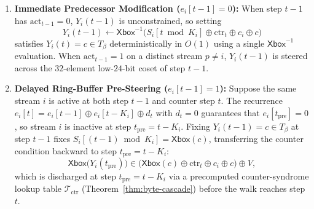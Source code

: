 \documentclass[11pt,a4paper]{article}
\theoremstyle{definition}
\theoremstyle{remark}
\newcommand{\Xbox}{\mathsf{Xbox}}
\begin{document}
\begin{itemize}[leftmargin=2em]
    \begin{enumerate}
        \item \textbf{Immediate Predecessor Modification ($e_i[t-1] = 0$):} When step $t - 1$ has $\mathrm{act}_{t-1} = 0$, $Y_i(t-1)$ is unconstrained, so setting
        \begin{equation}
        \label{eq:ctr-inv}
        Y_i(t-1) \leftarrow \Xbox^{-1}\!\big(S_i[t \bmod K_i] \oplus \mathrm{ctr}_t \oplus c_i \oplus c\big)
        \end{equation}
        satisfies $Y_i(t) = c \in T_\beta$ deterministically in $O(1)$ using a single $\Xbox^{-1}$ evaluation. When $\mathrm{act}_{t-1} = 1$ on a distinct stream $p \neq i$, $Y_i(t-1)$ is steered across the $32$-element low-$24$-bit coset of step $t - 1$.
        \item \textbf{Delayed Ring-Buffer Pre-Steering ($e_i[t-1] = 1$):} Suppose the same stream $i$ is active at both step $t - 1$ and counter step $t$. The recurrence $e_i[t] = e_i[t-1] \oplus e_i[t - K_i] \oplus d_t$ with $d_t = 0$ guarantees that $e_i[t_{\mathrm{pre}}] = 0$, so stream $i$ is inactive at step $t_{\mathrm{pre}} = t - K_i$. Fixing $Y_i(t-1) = c \in T_\beta$ at step $t - 1$ fixes $S_i[(t-1)\bmod K_i] = \Xbox(c)$, transferring the counter condition backward to step $t_{\mathrm{pre}} = t - K_i$:
        \begin{equation}
        \label{eq:ring-preset}
        \Xbox\big(Y_i(t_{\mathrm{pre}})\big) \in \big(\Xbox(c) \oplus \mathrm{ctr}_t \oplus c_i \oplus c\big) \oplus V,
        \end{equation}
        which is discharged at step $t_{\mathrm{pre}} = t - K_i$ via a precomputed counter-syndrome lookup table $\mathcal{T}_{\mathrm{ctr}}$ (Theorem~\ref{thm:byte-cascade}) before the walk reaches step $t$.
    \end{enumerate}
\end{itemize}
\end{document}
